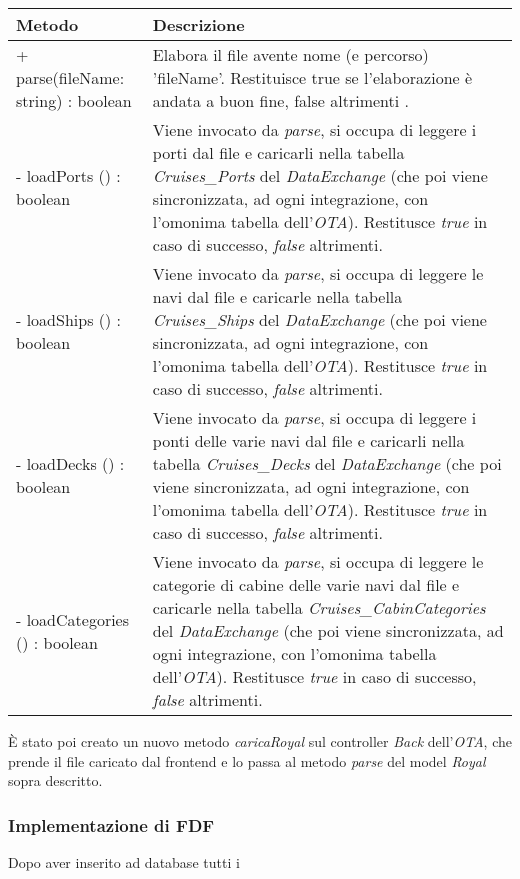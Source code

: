 \begin{center}
	\def\arraystretch{1.5}
	\begin{longtable}{ >{\raggedright}p{5.5cm} p{6.8cm}} 
		\hline
		\textbf{Metodo} & \textbf{Descrizione} \\ \hline
		+ parse(fileName: string) : boolean & Elabora il file avente nome (e percorso) 'fileName'. Restituisce true se l'elaborazione è andata a buon fine, false altrimenti .\\
		\hline
		- loadPorts () : boolean & Viene invocato da \textit{parse}, si occupa di leggere i porti dal file e caricarli nella tabella \textit{Cruises\_Ports} del \textit{DataExchange} (che poi viene sincronizzata, ad ogni integrazione, con l'omonima tabella dell'\textit{OTA}). Restitusce \textit{true} in caso di successo, \textit{false} altrimenti.\\
		\hline
		- loadShips () : boolean & Viene invocato da \textit{parse}, si occupa di leggere le navi dal file e caricarle nella tabella \textit{Cruises\_Ships} del \textit{DataExchange} (che poi viene sincronizzata, ad ogni integrazione, con l'omonima tabella dell'\textit{OTA}). Restitusce \textit{true} in caso di successo, \textit{false} altrimenti.\\
		\hline
		- loadDecks () : boolean & Viene invocato da \textit{parse}, si occupa di leggere i ponti delle varie navi dal file e caricarli nella tabella \textit{Cruises\_Decks} del \textit{DataExchange} (che poi viene sincronizzata, ad ogni integrazione, con l'omonima tabella dell'\textit{OTA}). Restitusce \textit{true} in caso di successo, \textit{false} altrimenti.\\
		\hline
		- loadCategories () : boolean & Viene invocato da \textit{parse}, si occupa di leggere le categorie di cabine delle varie navi dal file e caricarle nella tabella \textit{Cruises\_CabinCategories} del \textit{DataExchange} (che poi viene sincronizzata, ad ogni integrazione, con l'omonima tabella dell'\textit{OTA}). Restitusce \textit{true} in caso di successo, \textit{false} altrimenti.\\
		\hline
	\end{longtable}
\end{center}
È stato poi creato un nuovo metodo \textit{caricaRoyal} sul controller \textit{Back} dell'\textit{OTA}, che prende il file caricato dal frontend e lo passa al metodo \textit{parse} del model \textit{Royal} sopra descritto.

\subsubsection{Implementazione di FDF}
Dopo aver inserito ad database tutti i 